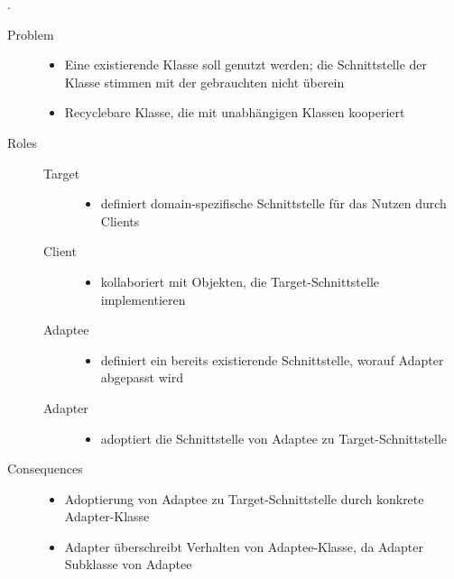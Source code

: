.\begin{description}
    \item[Problem] \hfill
    \begin{itemize}
        \item Eine existierende Klasse soll genutzt werden; die Schnittstelle der Klasse stimmen mit der gebrauchten nicht überein
        \item Recyclebare Klasse, die mit unabhängigen Klassen kooperiert
    \end{itemize}
    \item[Roles] \hfill
    \begin{description}
        \item[Target] \hfill
        \begin{itemize}
            \item definiert domain-spezifische Schnittstelle für das Nutzen durch Clients
        \end{itemize}
        \item[Client] \hfill 
        \begin{itemize}
            \item kollaboriert mit Objekten, die Target-Schnittstelle implementieren
        \end{itemize}
        \item[Adaptee] \hfill 
        \begin{itemize}
            \item definiert ein bereits existierende Schnittstelle, worauf Adapter abgepasst wird
        \end{itemize}
        \item[Adapter] \hfill 
        \begin{itemize}
            \item adoptiert die Schnittstelle von Adaptee zu Target-Schnittstelle
        \end{itemize}
    \end{description}
    \item[Consequences] \hfill 
        \begin{itemize}
            \item Adoptierung von Adaptee zu Target-Schnittstelle durch konkrete Adapter-Klasse
            \item Adapter überschreibt Verhalten von Adaptee-Klasse, da Adapter Subklasse von Adaptee 
        \end{itemize}
\end{description}

\pagebreak

